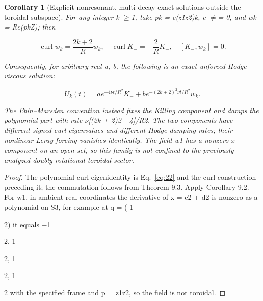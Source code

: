 \documentclass[10pt,letterpaper]{article}
\newtheorem{corollary}[theorem]{Corollary}
\theoremstyle{remark}
\begin{document}
\begin{corollary}[Explicit nonresonant, multi-decay exact solutions outside the toroidal subspace]

For any integer k \(\ge \)1, take pk = c(z1z2)k, c \(\ne \)= 0, and wk = Re(pkZ); then


\begin{equation}
\tag{63}\label{eq:63}
\operatorname{curl}w_k=\frac{2k+2}R w_k,\quad\operatorname{curl}K_-=-\frac2R K_-,\quad[K_-,w_k]=0.
\end{equation}

Consequently, for arbitrary real a, b, the following is an exact unforced Hodge-viscous solution:



\begin{equation}
\tag{64}\label{eq:64}
U_k(t)=a e^{-4\nu t/R^2}K_-+b e^{-(2k+2)^2\nu t/R^2}w_k.
\end{equation}

The Ebin–Marsden convention instead fixes the Killing component and damps the polynomial part with rate \(\nu \)[(2k + 2)2 \(- \)4]/R2. The two components have different signed curl eigenvalues and different Hodge damping rates; their nonlinear Leray forcing vanishes identically. The field w1 has a nonzero x-component on an open set, so this family is not confined to the previously analyzed doubly rotational toroidal sector.


\end{corollary}

\begin{proof}
The polynomial curl eigenidentity is Eq.~\eqref{eq:22} and the curl construction preceding it; the commutation follows from Theorem 9.3. Apply Corollary 9.2. For w1, in ambient real coordinates the derivative of x = c2 + d2 is nonzero as a polynomial on S3, for example at q = ( 1

2) it equals \(- \)1


2, 1


2, 1


2, 1


2 with the specified frame and p = z1z2, so the field is not toroidal.


\end{proof}
\end{document}
